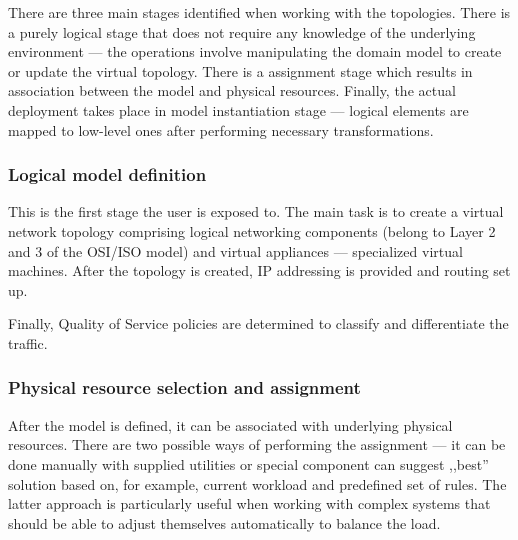 \documentclass[11pt]{book}
\begin{document}

          There are three main stages identified when working with the topologies. There is a purely logical stage that
          does not require any knowledge of the underlying environment --- the operations involve manipulating the
          domain model to create or update the virtual topology. There is a assignment stage which results in
          association between the model and physical resources. Finally, the actual deployment takes place in model
          instantiation stage --- logical elements are mapped to low-level ones after performing necessary
          transformations.



        \subsubsection{Logical model definition}

          This is the first stage the user is exposed to. The main task is to create a virtual network topology
          comprising logical networking components (belong to Layer 2 and 3 of the OSI/ISO model) and virtual appliances
          --- specialized virtual machines. After the topology is created, IP addressing is provided and routing set up.


          Finally, Quality of Service policies are determined to classify and differentiate the traffic.


        \subsubsection{Physical resource selection and assignment}

          After the model is defined, it can be associated with underlying physical resources. There are two possible
          ways of performing the assignment --- it can be done manually with supplied utilities or special component can
          suggest ,,best'' solution based on, for example, current workload and predefined set of rules. The latter
          approach is particularly useful when working with complex systems that should be able to adjust themselves
          automatically to balance the load.
\end{document}

